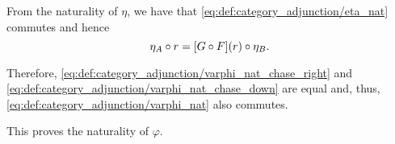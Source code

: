 \begin{defproof}
  From the naturality of \( \eta \), we have that \eqref{eq:def:category_adjunction/eta_nat} commutes and hence
  \begin{equation*}
    \eta_A \bincirc r
    =
    [G \bincirc F](r) \bincirc \eta_B.
  \end{equation*}

  Therefore, \eqref{eq:def:category_adjunction/varphi_nat_chase_right} and \eqref{eq:def:category_adjunction/varphi_nat_chase_down} are equal and, thus, \eqref{eq:def:category_adjunction/varphi_nat} also commutes.

  This proves the naturality of \( \varphi \).
\end{defproof}
